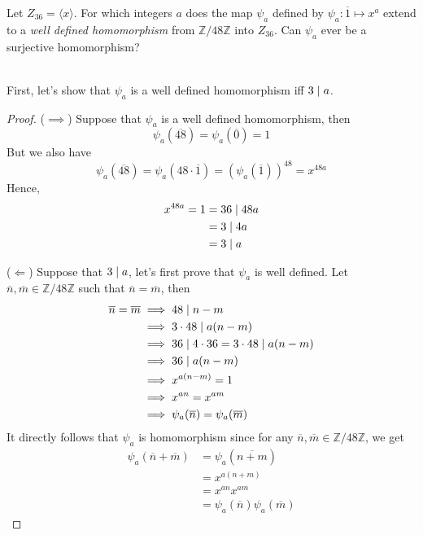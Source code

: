 \begin{exercise}
    Let $Z_{36}=\langle x\rangle$. For which integers $a$ does the map 
    $\psi_a$ defined by $\psi_a:\overline{1}\mapsto x^a$ extend to a
    \textit{well defined homomorphism} from $\mathbb{Z}/48\mathbb{Z}$
    into $Z_{36}$. Can $\psi_a$ ever be a surjective homomorphism?\\
\end{exercise}

\begin{solution}
    \\First, let's show that $\psi_a$ is a well defined homomorphism iff
    $3 \mathrel{|} a$.
    \begin{proof}
        ($\implies$) Suppose that $\psi_a$ is a well defined homomorphism,
        then
        $$\psi_a(\overline{48})=\psi_a(\overline{0})=1$$
        But we also have
        $$\psi_a(\overline{48})=\psi_a(48\cdot\overline{1})=
        \left(\psi_a(\overline{1})\right)^{48}=x^{48a}$$
        Hence,
        \begin{align*}
            x^{48a} = 1 &= 36 \mathrel{|} 48a \\
            &= 3 \mathrel{|} 4a \\
            &= 3 \mathrel{|} a
        \end{align*}

        ($\Longleftarrow$) Suppose that $3 \mathrel{|} a$, let's first prove that
        $\psi_a$ is well defined. Let $\overline{n},
        \overline{m}\in \mathbb{Z}/48\mathbb{Z}$ such that
        $\overline{n}=\overline{m}$, then 
        \begin{align*}
            \overline{n}=\overline{m} &\implies 48 \mathrel{|} n-m \\
            &\implies 3\cdot48 \mathrel{|} a(n-m) \\
            &\implies 36 \mathrel{|} 4\cdot 36 = 3\cdot 48 \mathrel{|} a(n-m) \\
            &\implies 36 \mathrel{|} a(n-m) \\
            &\implies x^{a(n-m)} = 1 \\
            &\implies x^{an} = x^{am} \\
            &\implies \psi_a(\overline{n}) = \psi_a(\overline{m})
        \end{align*}
        It directly follows that $\psi_a$ is homomorphism since for any
        $\overline{n},\overline{m}\in \mathbb{Z}/48\mathbb{Z}$, we get
        \begin{align*}
            \psi_a(\overline{n} +\overline{m}) &= \psi_a(\overline{n+m})\\
            &= x^{a(n+m)}\\
            &= x^{an}x^{am} \\
            &= \psi_a(\overline{n}) \psi_a(\overline{m})
        \end{align*}
    \end{proof}


\end{solution}

